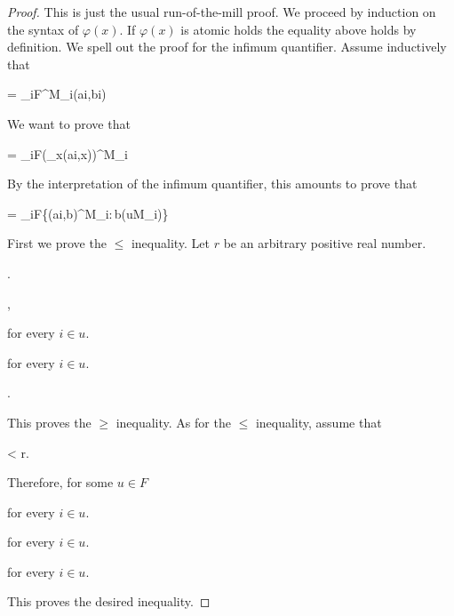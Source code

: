 \documentclass[12pt,letterpaper,oneside,reqno]{amsart}
\theoremstyle{plain}
\theoremstyle{remark}
\begin{document}
\begin{proof}
This is just the usual run-of-the-mill proof.
We proceed by induction on the syntax of $\varphi(x)$.
If $\varphi(x)$ is atomic holds the equality above holds by definition.
We spell out the proof for the infimum quantifier.
Assume inductively that

{=}
{\lim_{i\uparrow F}\varphi^{M_i}\big(\hat ai,\hat bi\big)}

We want to prove that 

{=}
{\lim_{i\uparrow F}\Big(\bigwedge_x\varphi\big(\hat ai,x\big)\Big)^{M_i}}

By the interpretation of the infimum quantifier, this amounts to prove that

{=}
{\lim_{i\uparrow F}\inf\big\{\varphi\big(\hat ai,b\big)^{M_i}:\,b\in(uM_i)\big\}}

First we prove the $\le$ inequality.
Let $r$ be an arbitrary positive real number.

.

,

\quad for every $i\in u$.

\quad for every $i\in u$.

.

\smallskip
This proves the $\ge$ inequality.
As for the $\le$ inequality, assume that
\smallskip

{<}
{r.}

Therefore, for some $u\in F$

\quad for every $i\in u$.

\quad for every $i\in u$.

\quad for every $i\in u$.



This proves the desired inequality.
\end{proof}
\end{document}
